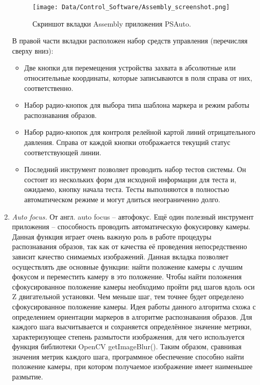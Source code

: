 \begin{enumerate}
\begin{figure}[ht]\centering
\texttt{[image: Data/Control\_Software/Assembly\_screenshot.png]}
\caption{Скриншот вкладки Assembly приложения PSAuto.}
\label{fig:assembly_screenshot}
\end{figure}

В правой части вкладки расположен набор средств управления (перечисляя сверху вниз):

\begin{itemize}
\setlength\itemsep{-0.5em}
\item Две кнопки для перемещения устройства захвата в абсолютные или относительные координаты, которые записываются в поля справа от них, соответственно.
\item Набор радио-кнопок для выбора типа шаблона маркера и режим работы распознавания образов.
\item Набор радио-кнопок для контроля релейной картой линий отрицательного давления. Справа от каждой кнопки отображается текущий статус соответствующей линии.
\item Последний инструмент позволяет проводить набор тестов системы. Он состоит из нескольких форм для исходной информации для теста и, ожидаемо, кнопку начала теста. Тесты выполняются в полностью автоматическом режиме и могут длиться неограниченно долго.
\end{itemize}

\item \emph{Auto focus.} От англ. auto focus -- автофокус. Ещё один полезный инструмент приложения -- способность проводить автоматическую фокусировку камеры. Данная функция играет очень важную роль в работе процедуры распознавания образов, так как от качества её проведения непосредственно зависит качество снимаемых изображений. Данная вкладка позволяет осуществлять две основные функции: найти положение камеры с лучшим фокусом и переместить камеру в это положение. Чтобы найти положения сфокусированное положение камеры необходимо пройти ряд шагов вдоль оси Z двигательной установки. Чем меньше шаг, тем точнее будет определено сфокусированное положение камеры. Идея работы данного алгоритма схожа с определением ориентации маркеров в алгоритме распознавания образов. Для каждого шага высчитывается и сохраняется определённое значение метрики, характеризующее степень размытости изображения, для чего используется функция библиотеки OpenCV getImageBlur(). Таким образом, сравнивая значения метрик каждого шага, программное обеспечение способно найти положение камеры, при котором получаемое изображение имеет наименьшее размытие.


\end{enumerate}
